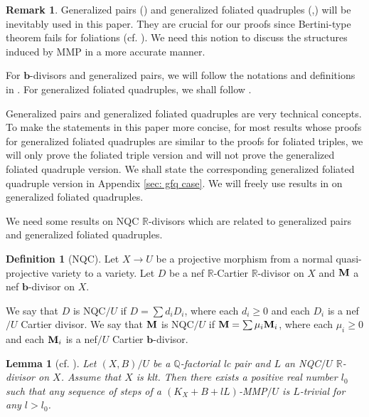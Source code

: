 \documentclass[11pt]{amsart}
\numberwithin{equation}{section}
\newcommand{\bb}{\bm{b}}
\newcommand{\Mm}{{\bf{M}}}
\newcommand{\Qq}{\mathbb{Q}}
\newcommand{\Rr}{\mathbb{R}}
\newtheorem{lem}[thm]{Lemma}
\theoremstyle{definition}
\newtheorem{defn}[thm]{Definition}
\theoremstyle{definition}
\newtheorem{rem}[thm]{Remark}
\theoremstyle{definition}
\begin{document}
\begin{rem}
Generalized pairs (\cite[Definition 1.4]{BZ16}) and generalized foliated quadruples (\cite[Definition 1.2]{LLM23},\cite[Definition 3.4.3]{CHLX23}) will be inevitably used in this paper. They are crucial for our proofs since Bertini-type theorem fails for foliations (cf. \cite[Example 3.4]{DLM23}). We need this notion to discuss the structures induced by MMP in a more accurate manner.

For $\bb$-divisors and generalized pairs, we will follow the notations and definitions in \cite{BZ16,HL23}. For generalized foliated quadruples, we shall follow \cite{CHLX23}. 

Generalized pairs and generalized foliated quadruples are very technical concepts. To make the statements in this paper more concise, for most results whose proofs for generalized foliated quadruples are similar to the proofs for foliated triples, we will only prove the foliated triple version and will not prove the generalized foliated quadruple version. We shall state the corresponding generalized foliated quadruple version in Appendix \ref{sec: gfq case}. We will freely use results in \cite{CHLX23} on generalized foliated quadruples.
\end{rem}

We need some results on NQC $\Rr$-divisors which are related to generalized pairs and generalized foliated quadruples.

\begin{defn}[NQC]
    Let $X\rightarrow U$ be a projective morphism from a normal quasi-projective variety to a variety. Let $D$ be a nef $\Rr$-Cartier $\Rr$-divisor on $X$ and $\Mm$ a nef $\bb$-divisor on $X$.

    We say that $D$ is NQC$/U$ if $D=\sum d_iD_i$, where each $d_i\geq 0$ and each $D_i$ is a nef$/U$ Cartier divisor. We say that $\Mm$ is NQC$/U$ if $\Mm=\sum \mu_i\Mm_i$, where each $\mu_i\geq 0$ and each $\Mm_i$ is a nef$/U$ Cartier $\bb$-divisor.
\end{defn}

\begin{lem}[{cf. \cite[Lemma 4.4(3)]{BZ16}}]\label{lem: bz16 4.4(3)}
    Let $(X,B)/U$ be a $\Qq$-factorial lc pair and $L$ an NQC$/U$ $\Rr$-divisor on $X$. Assume that $X$ is klt. Then there exists a positive real number $l_0$ such that any sequence of steps of a $(K_X+B+lL)$-MMP$/U$ is $L$-trivial for any $l>l_0$.
\end{lem}
\end{document}
